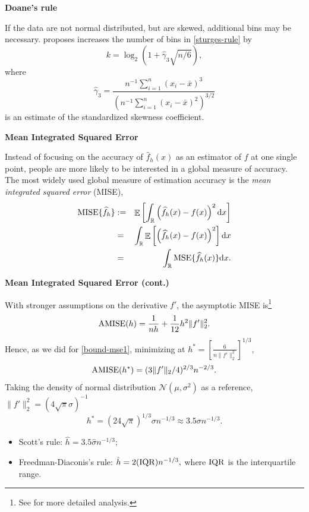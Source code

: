 \documentclass[19pt,landscape]{article}
\DeclareMathOperator{\E}{\mathbb{E}}
\newcommand{\R}{\mathbb{R}}
\begin{document}
\newpage
{\LARGE{\textbf{Doane's rule}}}
\vskip15pt
\begin{minipage}{.9\textwidth}
    \Large 
If the data are not normal distributed, but are skewed, additional bins may be necessary. \cite{doane76} proposes increases the number of bins in \eqref{sturges-rule} by 
\begin{equation}\label{doane-rule}    k=\log_2(1+\hat{\gamma}_3\sqrt{n/6}),
\end{equation}
where 
$$\hat{\gamma}_3=\frac{n^{-1}\sum_{i=1}^n(x_i-\bar{x})^3}{(n^{-1}\sum_{i=1}^n(x_i-\bar{x})^2)^{3/2}}$$
is an estimate of the standardized skewness coefficient. 
\end{minipage}

\newpage
{\LARGE{\textbf{Mean Integrated Squared Error}}}
\vskip15pt
\begin{minipage}{.9\textwidth}
    \Large 
Instead of focusing on the accuracy of $\widehat{f}_h(x)$ as an estimator of $f$ at one single point, people are more likely to be interested in a global measure of accuracy. The most widely used global measure of estimation accuracy is the {\it mean integrated squared error} (MISE), 
\begin{eqnarray}
    {\rm MISE}\{\widehat{f}_h\}&:=&\E\left[\int_{\R}\left(\widehat{f}_h(x)-f(x)\right)^2\mathrm{d}x\right]\\
&=&\int_{\R}\E\left[\left(\widehat{f}_h(x)-f(x)\right)^2\right]\mathrm{d}x\nonumber\\
&=&\int_{\R}{\rm MSE}\{\widehat{f}_h(x)\}\mathrm{d}x.
\end{eqnarray}

\end{minipage}

\newpage
{\LARGE{\textbf{Mean Integrated Squared Error (cont.)}}}
\vskip15pt
\begin{minipage}{.9\textwidth}
    \Large 
    With stronger assumptions on the derivative $f'$, the asymptotic MISE is\footnote{See \cite[Section~3.2]{scott15} for more detailed analysis.}
    $${\rm AMISE}(h)=\frac1{nh}+\frac1{12}h^2\|f'\|_2^2.$$
    Hence, as we did for \eqref{bound-mse1}, minimizing at $h^*=\left[\frac6{n\|f'\|_2^2}\right]^{1/3}$, 
    \begin{equation}
    {\rm AMISE}(h^*)=(3\|f'\|_2/4)^{2/3}n^{-2/3}.
    \end{equation}
    Taking the density of normal distribution $\mathcal{N}(\mu,\sigma^2)$ as a reference, $\|f'\|_2^2=(4\sqrt{\pi}\sigma)^{-1}$
    \begin{equation}
        h^*=(24\sqrt{\pi})^{1/3}\sigma n^{-1/3}\approx 3.5\sigma n^{-1/3}.
        \end{equation}
        \begin{itemize}
            \item Scott's rule: $\hat{h}=3.5\hat{\sigma}n^{-1/3}$;
            \item Freedman-Diaconis's rule: $\hat{h}=2({\rm IQR})n^{-1/3},$ where ${\rm IQR}$ is the interquartile range. 
        \end{itemize}
\end{minipage}
\end{document}
